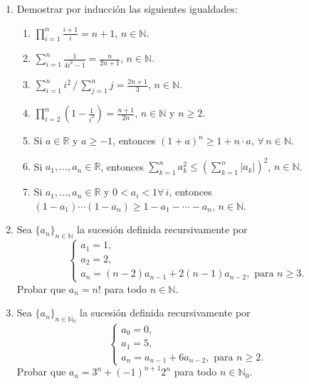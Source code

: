 \documentclass[a4paper,12pt,twoside,spanish,reqno]{amsbook}
\numberwithin{equation}{section}
\begin{document}
\begin{enumerate}[resume]
\item Demostrar por inducción  las siguientes igualdades:
    \begin{enumerate}
        \item  $\displaystyle{ \prod_{i=1}^n \frac{i+1}{i} = n+1}$, $n\in \mathbb N$.
        \item $\displaystyle{ \sum_{i=1}^n \frac{1}{4i^2-1} = \frac{n}{2n+1}}$, $n\in \mathbb N$.
        \item $\displaystyle{ \sum_{i=1}^n i^2\, /\, \sum_{j=1}^n j = \frac{2n+1}{3}}$, $n\in \mathbb N$.
        \item $\displaystyle{ \prod_{i=2}^n \left(1-\frac{1}{i^2}\right) = \frac{n+1}{2n}}$, $n\in \mathbb N$ y $ n\ge 2$.
        \item Si $a\in \mathbb R$ y $a\geq -1$, entonces $(1+a)^n\geq 1+n\cdot a$, $\forall \, n \in \mathbb N$.
        \item Si $a_1,\dots,a_n \in \mathbb R$, entonces $\displaystyle{\sum_{k=1}^n a_{k}^{2}\leq \left(\sum_{k=1}^n |a_{k}|\right)^{2}}$, $n\in \mathbb N$.
        \item Si $a_1,\dots,a_n \in \mathbb R$ y $0<a_i<1 \forall \, i$, entonces $(1-a_1)\cdots(1-a_n)\ge 1-a_1-\cdots -a_n$, $n\in \mathbb N$.
    \end{enumerate}

\item Sea $\{a_n\}_{n\in\mathbb N}$ la sucesión definida recursivamente por
    \begin{equation*}
        \begin{cases}
            a_1=1, \\a_2=2, \\a_{n} = (n-2)a_{n-1}+2(n-1)a_{n-2}, \text{ para $n\geq 3$}.
        \end{cases}
    \end{equation*}
    Probar que $a_n=n!$ para todo $n\in \mathbb N$.

\item Sea $\{a_n\}_{n\in\mathbb N_0}$ la sucesión definida recursivamente por
    \begin{equation*}
        \begin{cases}
            a_0=0, \\a_1=5, \\a_{n} = a_{n-1}+6a_{n-2}, \text{ para $n\geq 2$}.
        \end{cases}
    \end{equation*}
    Probar que $a_n=3^n + (-1)^{n+1}2^n$ para todo $n\in \mathbb N_0$.


\end{enumerate}
\end{document}
